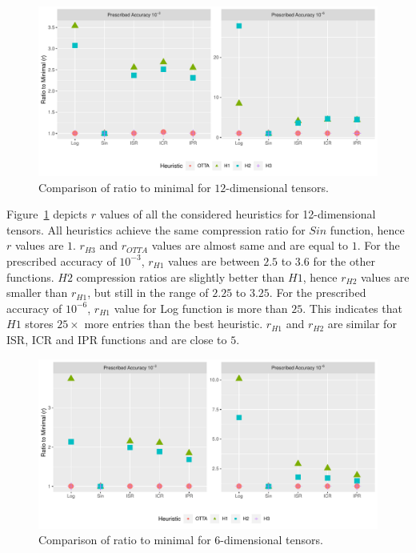 \documentclass[runningheads]{llncs}
\begin{document}
\begin{figure}[!htb]
	\begin{center}
		\includegraphics[scale=0.56]{./ratio_to_minimal-4-12.pdf}
	\end{center}
\caption{Comparison of ratio to minimal for $12$-dimensional tensors.\label{fig:rtm-12}}
\end{figure}

\noindent Figure~\ref{fig:rtm-12} depicts $r$ values of all the considered heuristics for 12-dimensional tensors. All heuristics achieve the same compression ratio for $Sin$ function, hence $r$ values are $1$. $r_{H3}$ and $r_{OTTA}$ values are almost same and are equal to $1$. For the prescribed accuracy of $10^{-3}$, $r_{H1}$ values are between $2.5$ to $3.6$ for the other functions. $H2$ compression ratios are slightly better than $H1$, hence $r_{H2}$ values are smaller than $r_{H1}$, but still in the range of $2.25$ to $3.25$. For the prescribed accuracy of $10^{-6}$, $r_{H1}$ value for Log function is more than $25$. This indicates that $H1$ stores $25\times$ more entries than the best heuristic. $r_{H1}$ and $r_{H2}$ are similar for ISR, ICR and IPR functions and are close to $5$. 

\begin{figure}[!htb]
	\begin{center}
		\includegraphics[scale=0.56]{./ratio_to_minimal-16-6.pdf}
	\end{center}
	\caption{Comparison of ratio to minimal for $6$-dimensional tensors.\label{fig:rtm-6}}
\end{figure}
\end{document}
